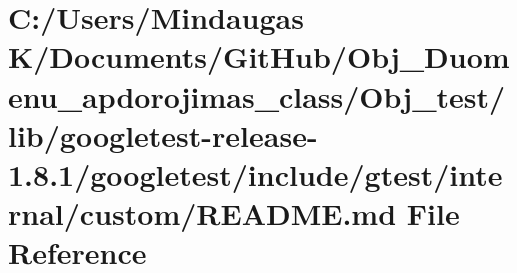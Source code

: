 \hypertarget{_obj__test_2lib_2googletest-release-1_88_81_2googletest_2include_2gtest_2internal_2custom_2_r_e_a_d_m_e_8md}{}\section{C\+:/\+Users/\+Mindaugas K/\+Documents/\+Git\+Hub/\+Obj\+\_\+\+Duomenu\+\_\+apdorojimas\+\_\+class/\+Obj\+\_\+test/lib/googletest-\/release-\/1.8.1/googletest/include/gtest/internal/custom/\+R\+E\+A\+D\+ME.md File Reference}
\label{_obj__test_2lib_2googletest-release-1_88_81_2googletest_2include_2gtest_2internal_2custom_2_r_e_a_d_m_e_8md}
